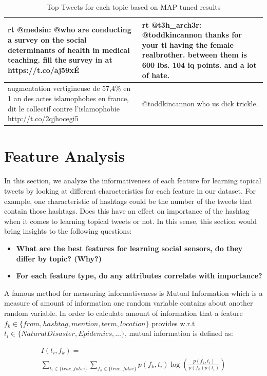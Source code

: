 \documentclass[letterpaper]{article}
\newcommand{\xmark}{\ding{55}}%
\begin{document}
\begin{table}[]
{{\begin{tabular}{|l|l|}
\xmark  rt @medsin: @who are conducting a survey on the social determinants of health in medical teaching. fill the survey in at https://t.co/aj59xÉ & \xmark  rt @t3h\_arch3r: @toddkincannon thanks for your tl having the female realbrother. between them is 600 lbs. 104 iq points. and a lot of hate. \\ \hline
\xmark  augmentation vertigineuse de 57,4\% en 1 an des actes islamophobes en france, dit le collectif contre l'islamophobie http://t.co/2qjhocegi5 & \xmark  @toddkincannon who us dick trickle. \\ \hline
\end{tabular}
}
}
\caption{Top Tweets for each topic based on MAP tuned results}
\label{table:topTweets}
\end{table}

\section{Feature Analysis}

In this section, we analyze the informativeness of each feature for learning topical tweets by looking at different characteristics for each feature in our dataset. For example, one characteristic of hashtags could be the number of the tweets that contain those hashtags. Does this have an effect on importance of the hashtag when it comes to learning topical tweets or not. In this sense, this section would bring insights to the following questions:

\begin{itemize}
\item \textbf{What are the best features for learning social sensors, do they differ by topic?  (Why?)}
\item \textbf{For each feature type, do any attributes correlate with importance?}
\end{itemize}

A famous method for measuring informativeness is Mutual Information which is a measure of amount of information one random variable contains about another random variable. In order to calculate amount of information that a feature $f_k \in \{from, hashtag, mention, term, location\}$ provides w.r.t $t_i \in \{NaturalDisaster, Epidemics, ...\}$, mutual information is defined as:

\begin{multline}
I(t_i, f_k)= \\
 \sum_{t_i\in \{ true, false \}} \sum_{f_k\in \{ true, false\}}p(f_k,t_i)\log \left ( \frac{p(f_k,t_i)}{p(f_k)p(t_i)} \right )
 \label{eq:eq1}
\end{multline}
\end{document}
